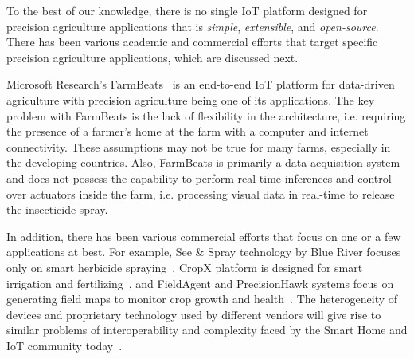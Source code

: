 To the best of our knowledge, there is no single IoT platform designed for precision agriculture applications that is \emph{simple}, \emph{extensible}, and \emph{open-source}. There has been various academic and commercial efforts that target specific precision agriculture applications, which are discussed next. 

Microsoft Research's FarmBeats~\cite{vasisht2017farmbeats} is an end-to-end IoT platform for data-driven agriculture with precision agriculture being one of its applications. The key problem with FarmBeats is the lack of flexibility in the architecture, i.e. requiring the presence of a farmer's home at the farm with a computer and internet connectivity. These assumptions may not be true for many farms, especially in the developing countries. Also, FarmBeats is primarily a data acquisition system and does not possess the capability to perform real-time inferences and control over actuators inside the farm, i.e. processing visual data in real-time to release the insecticide spray. 


In addition, there has been various commercial efforts that focus on one or a few applications at best. For example, See \& Spray technology by Blue River focuses only on smart herbicide spraying~\cite{see&spray}, CropX platform is designed for smart irrigation and fertilizing~\cite{cropx}, and FieldAgent and PrecisionHawk systems focus on generating field maps to monitor crop growth and health~\cite{precisionhawk, fieldagent-sentera}. The heterogeneity of devices and proprietary technology used by different vendors will give rise to similar problems of interoperability and complexity faced by the Smart Home and IoT community today~\cite{home-os-challenges}. 